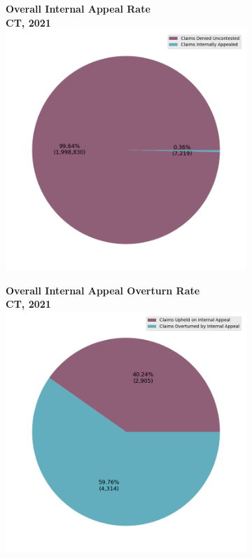 \documentclass[12pt, a4paper,twoside,parskip=full]{report}
\theoremstyle{plain} %
\theoremstyle{definition} %
\theoremstyle{remark} %
\numberwithin{equation}{chapter}
\begin{document}
		
		\begin{figure}[h!]
			\centering
			\begin{subfigure}[b]{0.49\textwidth}
				\centering
				\textbf{Overall Internal Appeal Rate}\\
				\textbf{CT, 2021}\\
				\includegraphics[width=\textwidth]{images/ct_claims/internal_appeal_rates_all_insurers.png}
			\end{subfigure}
			\hfill
			\begin{subfigure}[b]{0.49\textwidth}
				\centering
				\textbf{Overall Internal Appeal Overturn Rate}\\
				\textbf{CT, 2021}\\
				\includegraphics[width=\textwidth]{images/ct_claims/internal_appeal_success_rates_all_insurers.png}

\end{subfigure}
\end{figure}
\end{document}
